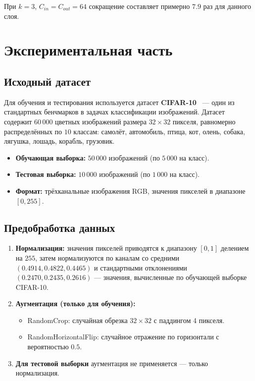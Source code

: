 При $k = 3$, $C_{in} = C_{out} = 64$ сокращение составляет примерно $7.9$ раз для данного слоя.

\newpage
\section{Экспериментальная часть}

\subsection{Исходный датасет}

Для обучения и тестирования используется датасет \textbf{CIFAR-10}~\cite{cifar10} — один из стандартных бенчмарков в задачах классификации изображений. Датасет содержит $60\,000$ цветных изображений размера $32 \times 32$ пикселя, равномерно распределённых по $10$ классам: самолёт, автомобиль, птица, кот, олень, собака, лягушка, лошадь, корабль, грузовик.

\begin{itemize}
    \item \textbf{Обучающая выборка:} $50\,000$ изображений (по $5\,000$ на класс).
    \item \textbf{Тестовая выборка:} $10\,000$ изображений (по $1\,000$ на класс).
    \item \textbf{Формат:} трёхканальные изображения RGB, значения пикселей в диапазоне $[0, 255]$.
\end{itemize}

\subsection{Предобработка данных}

\begin{enumerate}
    \item \textbf{Нормализация:} значения пикселей приводятся к диапазону $[0, 1]$ делением на $255$, затем нормализуются по каналам со средними $(0.4914, 0.4822, 0.4465)$ и стандартными отклонениями $(0.2470, 0.2435, 0.2616)$ — значения, вычисленные по обучающей выборке CIFAR-10.
    \item \textbf{Аугментация (только для обучения):}
    \begin{itemize}
        \item RandomCrop: случайная обрезка $32 \times 32$ с паддингом 4 пикселя.
        \item RandomHorizontalFlip: случайное отражение по горизонтали с вероятностью $0.5$.
    \end{itemize}
    \item \textbf{Для тестовой выборки} аугментация не применяется — только нормализация.
\end{enumerate}


